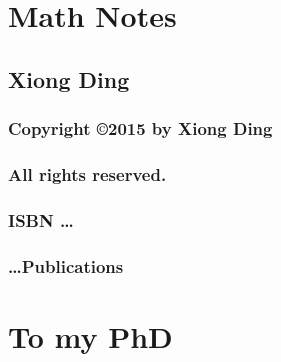 \documentclass[12pt]{book}
\begin{document}
\frontmatter
%
\chapter*{\Huge \center Math Notes}
\thispagestyle{empty}
\section*{\huge \center Xiong Ding}
\newpage
\subsection*{\center \normalsize Copyright \copyright 2015 by Xiong Ding}
\subsection*{\center \normalsize All rights reserved.}
\subsection*{\center \normalsize ISBN \dots}
\subsection*{\center \normalsize \dots Publications}
%
\chapter*{\center \normalsize To my PhD}
%
\tableofcontents
%
\mainmatter

\end{document}
